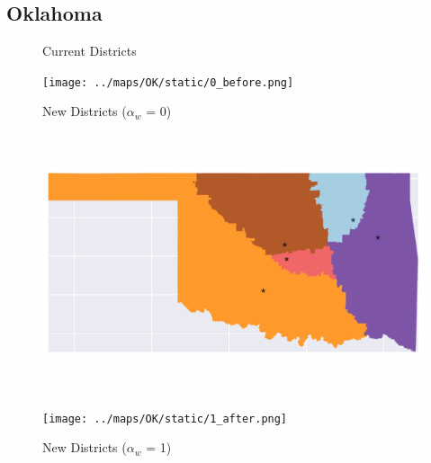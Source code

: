 \subsection{Oklahoma}
\begin{figure}[htb!] \centering
\caption{ Current Districts }
\texttt{[image: ../maps/OK/static/0\_before.png]}
\caption{ New Districts ($\alpha_w$ = 0) }
\includegraphics[width=5in,height=3in,keepaspectratio]{../maps/OK/static/0_after.png}
\caption{ New Districts ($\alpha_w$ = 1) }
\texttt{[image: ../maps/OK/static/1\_after.png]}
\end{figure}

\clearpage
\newpage

